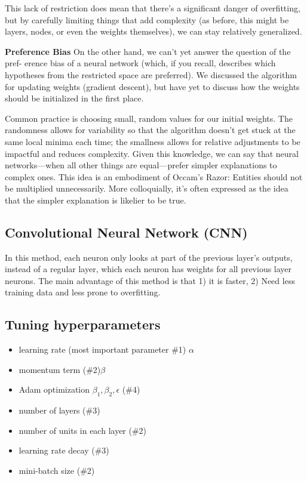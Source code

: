 \documentclass[12pt]{report}
\begin{document}
This lack of restriction does mean that there’s a significant danger of overfitting, but by carefully limiting things that add complexity (as before, this might be layers, nodes, or even the weights themselves), we can stay relatively generalized.


\textbf{Preference Bias} On the other hand, we can’t yet answer the question of the pref-
erence bias of a neural network (which, if you recall, describes which hypotheses from
the restricted space are preferred). We discussed the algorithm for updating weights
(gradient descent), but have yet to discuss how the weights should be initialized in the first place.

Common practice is choosing small, random values for our initial weights. The randomness allows for variability so that the algorithm doesn’t get stuck at the same local minima each time; the smallness allows for relative adjustments to be impactful and reduces complexity. Given this knowledge, we can say that neural networks—when all other things are equal—prefer simpler explanations to complex ones. This idea is an embodiment of Occam’s Razor: Entities should not be multiplied unnecessarily. More colloquially, it’s often expressed as the idea that the simpler explanation is likelier to be true.




\subsection{Convolutional Neural Network (CNN)}
In this method, each neuron only looks at part of the previous layer's outputs, instead of a regular layer, which each neuron has weights for all previous layer neurons. The main advantage of this method is that 1) it is faster, 2) Need less training data and less prone to overfitting.

\subsection{Tuning hyperparameters}

\begin{itemize}
  \item learning rate (most important parameter \#1) $\alpha$
  \item momentum term  (\#2)$\beta$
  \item Adam optimization $\beta_1, \beta_2, \epsilon$ (\#4)
  \item number of layers (\#3)
  \item number of units in each layer (\#2)
  \item learning rate decay (\#3)
  \item mini-batch size (\#2)
\end{itemize}
\end{document}
